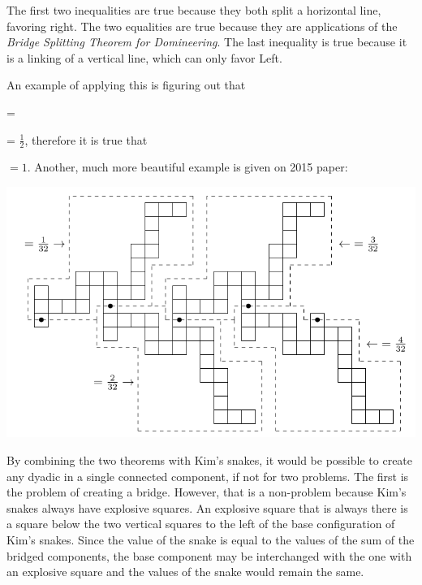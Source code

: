The first two inequalities are true because they both split a horizontal line, favoring right. The two equalities are true because they are applications of the \textit{Bridge Splitting Theorem for Domineering}. The last inequality is true because it is a linking of a vertical line, which can only favor Left.

An example of applying this is figuring out that  =
 = $\frac{1}{2}$, therefore it is true that 
 $=1$. Another, much more beautiful example is given on 2015 paper:

\includegraphics[scale=0.5]{../images/dyadic_domineering.png}

By combining the two theorems with Kim's snakes, it would be possible to create any dyadic in a single connected component, if not for two problems. The first is the problem of creating a bridge. However, that is a non-problem because Kim's snakes always have explosive squares. An explosive square that is always there is a square below the two vertical squares to the left of the base configuration of Kim's snakes. Since the value of the snake is equal to the values of the sum of the bridged components, the base component may be interchanged with the one with an explosive square and the values of the snake would remain the same.

